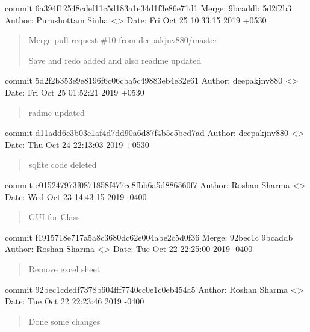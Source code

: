 \documentclass[letterpaper,10pt,english]{sphinxmanual}
\begin{document}
commit 6a394f12548cdef11c5d183a1e34d1f3e86e71d1
Merge: 9bcaddb 5d2f2b3
Author: Purushottam Sinha \textless{}\textgreater{}
Date:   Fri Oct 25 10:33:15 2019 +0530
\begin{quote}

Merge pull request \#10 from deepakjnv880/master

Save and redo added and also readme updated
\end{quote}

commit 5d2f2b353e9e8196f6c06cba5c49883eb4e32e61
Author: deepakjnv880 \textless{}\textgreater{}
Date:   Fri Oct 25 01:52:21 2019 +0530
\begin{quote}

radme updated
\end{quote}

commit d11add6c3b03e1af4d7dd90a6d87f4b5c5bed7ad
Author: deepakjnv880 \textless{}\textgreater{}
Date:   Thu Oct 24 22:13:03 2019 +0530
\begin{quote}

sqlite code deleted
\end{quote}

commit e015247973f0871858f477cc8fbb6a5d886560f7
Author: Roshan Sharma \textless{}\textgreater{}
Date:   Wed Oct 23 14:43:15 2019 -0400
\begin{quote}

GUI for Class
\end{quote}

commit f1915718e717a5a8c3680dc62e004abe2c5d0f36
Merge: 92bec1c 9bcaddb
Author: Roshan Sharma \textless{}\textgreater{}
Date:   Tue Oct 22 22:25:00 2019 -0400
\begin{quote}

Remove excel sheet
\end{quote}

commit 92bec1cdedf7378b604fff7740cc0e1c0eb454a5
Author: Roshan Sharma \textless{}\textgreater{}
Date:   Tue Oct 22 22:23:46 2019 -0400
\begin{quote}

Done some changes
\end{quote}
\end{document}
